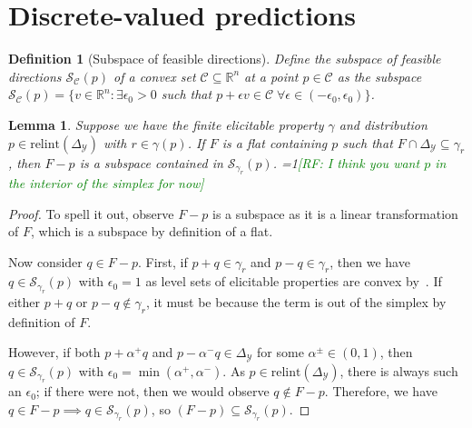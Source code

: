 \documentclass{article}
\newcommand{\Comments}{1}
\newcommand{\mynote}[2]{\ifnum\Comments=1\textcolor{#1}{#2}\fi}
\newcommand{\raf}[1]{\mynote{green}{[RF: #1]}}
\newcommand{\reals}{\mathbb{R}}
\newcommand{\simplex}{\Delta_\Y}
\newcommand{\relint}[1]{\mathrm{relint}(#1)}
\newcommand{\C}{\mathcal{C}}
\newcommand{\R}{\mathcal{R}}
\renewcommand{\S}{\mathcal{S}}
\newcommand{\Y}{\mathcal{Y}}
\newtheorem{lemma}{Lemma}
\newtheorem{definition}{Definition}
\begin{document}
\section{Discrete-valued predictions}\label{sec:finite-calib}


\begin{definition}[Subspace of feasible directions]
	Define the \emph{subspace of feasible directions} $\S_\C(p)$ of a convex set $\C \subseteq \reals^n$ at a point $p \in \C$ as the subspace $\S_\C(p) = \{ v \in \reals^n : \exists \epsilon_0 > 0 $ such that $p + \epsilon v \in \C \; \forall \epsilon \in (-\epsilon_0,\epsilon_0) \}$.
\end{definition}

\begin{lemma}\label{lem:feas-sub-is-a-flat}
	Suppose we have the finite elicitable property $\gamma$ and distribution $p \in \relint{\simplex}$ with $r \in \gamma(p)$.
	If $F$ is a flat containing $p$ such that $F \cap \simplex \subseteq \gamma_r$, then $F - p$ is a subspace contained in $\S_{\gamma_r}(p)$.
  \raf{I think you want $p$ in the interior of the simplex for now}
\end{lemma}
\begin{proof}
  To spell it out, observe $F-p$ is a subspace as it is a linear transformation of $F$, which is a subspace by definition of a flat.
  
  Now consider $q \in F - p$.
  First, if $p+q \in \gamma_r$ and $p -q \in \gamma_r$, then we have $q \in \S_{\gamma_r}(p)$ with $\epsilon_0 = 1$ as level sets of elicitable properties are convex by~\cite{lambert2009eliciting}.
  If either $p + q$ or $p - q \not \in \gamma_r$, it must be because the term is out of the simplex by definition of $F$.
  
  However, if both $p + \alpha^+ q$ and $p - \alpha^- q \in \simplex$ for some $\alpha^\pm \in (0,1)$, then $q \in \S_{\gamma_r}(p)$ with $\epsilon_0 = \min(\alpha^+, \alpha^-)$.
  As $p \in \relint{\simplex}$, there is always such an $\epsilon_0$; if there were not, then we would observe $q \not \in F - p$.
  Therefore, we have $q \in F - p \implies q \in \S_{\gamma_r}(p)$, so $(F - p) \subseteq \S_{\gamma_r}(p)$.
\end{proof}
\end{document}

